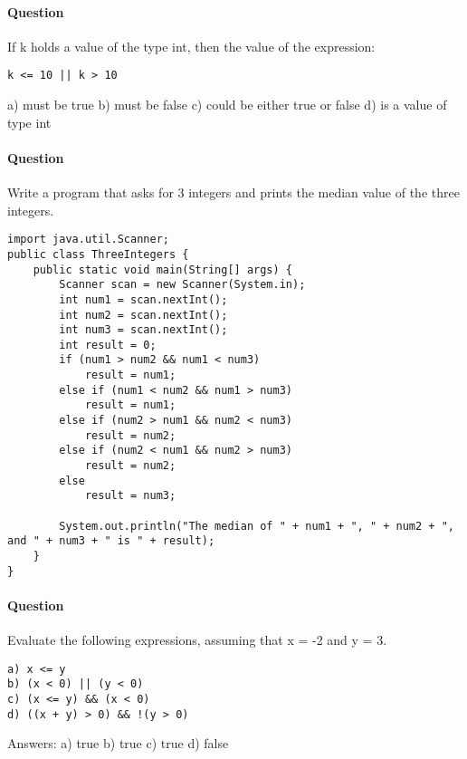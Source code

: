 \documentclass{article}
\begin{document}
\addtocounter{question_num}{1}
\paragraph{Question }
If k holds a value of the type int, then the value of the expression:
\begin{lstlisting}
k <= 10 || k > 10
\end{lstlisting}
a) must be true
\newline b) must be false
\newline c) could be either true or false
\newline d) is a value of type int

\addtocounter{question_num}{1}
\paragraph{Question }
Write a program that asks for 3 integers and prints the median value of the three integers.
\begin{lstlisting}
import java.util.Scanner;
public class ThreeIntegers {
	public static void main(String[] args) {
		Scanner scan = new Scanner(System.in);
		int num1 = scan.nextInt();
		int num2 = scan.nextInt();
		int num3 = scan.nextInt();
		int result = 0;
		if (num1 > num2 && num1 < num3)
			result = num1;
		else if (num1 < num2 && num1 > num3)
			result = num1;
		else if (num2 > num1 && num2 < num3)
			result = num2;
		else if (num2 < num1 && num2 > num3)
			result = num2;
		else
			result = num3;

		System.out.println("The median of " + num1 + ", " + num2 + ", and " + num3 + " is " + result);
	}
}
\end{lstlisting}

\addtocounter{question_num}{1}
\paragraph{Question }
Evaluate the following expressions, assuming that x = -2 and y = 3.
\begin{lstlisting} 
a) x <= y 
b) (x < 0) || (y < 0)
c) (x <= y) && (x < 0)
d) ((x + y) > 0) && !(y > 0)
\end{lstlisting}
{\color{red}Answers:
\newline a) true
\newline b) true
\newline c) true
\newline d) false}
\end{document}
